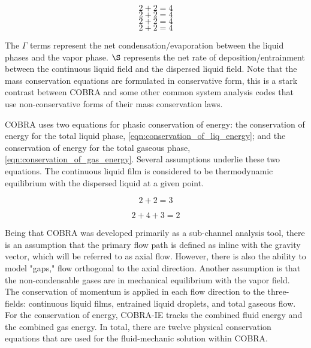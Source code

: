 \begin{equation}
\label{eqn:conservation_of_ncg}
2 + 2 = 4
\end{equation}
\begin{equation}
\label{eqn:conservation_of_continuous_liquid}
2 + 2 = 4
\end{equation}
\begin{equation}
\label{eqn:conservation_of_dispersed_liquid}
2 + 2 = 4
\end{equation}
\begin{equation}
\label{eqn:conservation_of_total_gas}
2 + 2 = 4
\end{equation}

The $\Gamma$ terms represent the net condensation/evaporation between the liquid phases and the vapor phase.
$\S$ represents the net rate of deposition/entrainment between the continuous liquid field and the dispersed liquid field.
Note that the mass conservation equations are formulated in conservative form, this is a stark contrast between COBRA and some other common system analysis codes \cite{TRACE, RELAP} that use non-conservative forms of their mass conservation laws.

COBRA uses two equations for phasic conservation of energy: the conservation of energy for the total liquid phase, \eqref{eqn:conservation_of_liq_energy}; and the conservation of energy for the total gaseous phase, \eqref{eqn:conservation_of_gas_energy}.
Several assumptions underlie these two equations.
The continuous liquid film is considered to be thermodynamic equilibrium with the dispersed liquid at a given point.

\begin{equation}
\label{eqn:conservation_of_liq_energy}
2 + 2 = 3
\end{equation} 

\begin{equation}
\label{eqn:conservation_of_gas_energy}
2 + 4  + 3 = 2
\end{equation}

Being that COBRA was developed primarily as a sub-channel analysis tool, there is an assumption that the primary flow path is defined as inline with the gravity vector, which will be referred to as axial flow.
However, there is also the ability to model "gaps," flow orthogonal to the axial direction.
Another assumption is that the non-condensable gases are in mechanical equilibrium with the vapor field.
The conservation of momentum is applied in each flow direction to the three-fields: continuous liquid films, entrained liquid droplets, and total gaseous flow.
For the conservation of energy, COBRA-IE tracks the combined fluid energy and the combined gas energy.
In total, there are twelve physical conservation equations that are used for the fluid-mechanic solution within COBRA.


